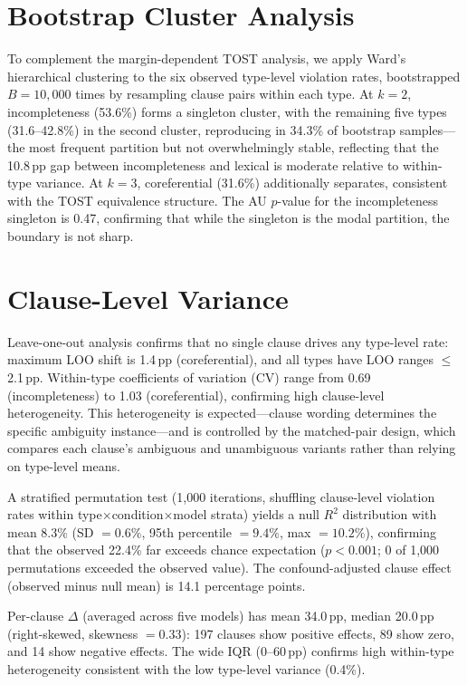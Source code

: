 \section{Bootstrap Cluster Analysis}
\label{app:cluster}

To complement the margin-dependent TOST analysis, we apply Ward's hierarchical clustering to the six observed type-level violation rates, bootstrapped $B = 10{,}000$ times by resampling clause pairs within each type. At $k = 2$, incompleteness (53.6\%) forms a singleton cluster, with the remaining five types (31.6--42.8\%) in the second cluster, reproducing in 34.3\% of bootstrap samples---the most frequent partition but not overwhelmingly stable, reflecting that the 10.8\,pp gap between incompleteness and lexical is moderate relative to within-type variance. At $k = 3$, coreferential (31.6\%) additionally separates, consistent with the TOST equivalence structure. The AU $p$-value for the incompleteness singleton is 0.47, confirming that while the singleton is the modal partition, the boundary is not sharp.

\section{Clause-Level Variance}
\label{app:clause_variance}

Leave-one-out analysis confirms that no single clause drives any type-level rate: maximum LOO shift is 1.4\,pp (coreferential), and all types have LOO ranges $\leq$2.1\,pp. Within-type coefficients of variation (CV) range from 0.69 (incompleteness) to 1.03 (coreferential), confirming high clause-level heterogeneity. This heterogeneity is expected---clause wording determines the specific ambiguity instance---and is controlled by the matched-pair design, which compares each clause's ambiguous and unambiguous variants rather than relying on type-level means.

A stratified permutation test (1,000 iterations, shuffling clause-level violation rates within type$\times$condition$\times$model strata) yields a null $R^2$ distribution with mean 8.3\% (SD $= 0.6\%$, 95th percentile $= 9.4\%$, max $= 10.2\%$), confirming that the observed 22.4\% far exceeds chance expectation ($p < 0.001$; 0 of 1,000 permutations exceeded the observed value). The confound-adjusted clause effect (observed minus null mean) is 14.1 percentage points.

Per-clause $\Delta$ (averaged across five models) has mean 34.0\,pp, median 20.0\,pp (right-skewed, skewness $= 0.33$): 197 clauses show positive effects, 89 show zero, and 14 show negative effects. The wide IQR (0--60\,pp) confirms high within-type heterogeneity consistent with the low type-level variance (0.4\%).

